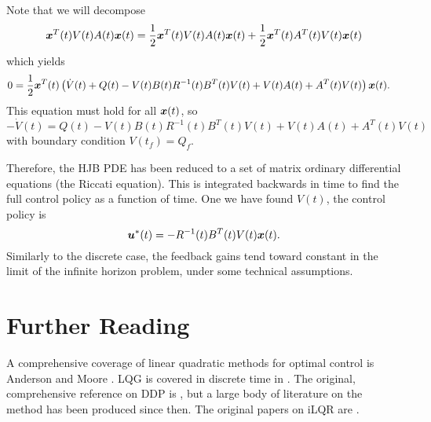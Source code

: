 Note that we will decompose
\begin{equation}
    \bm{x}^T(t) V(t) A(t) \bm{x}(t) = \frac{1}{2} \bm{x}^T(t) V(t) A(t) \bm{x}(t) + \frac{1}{2} \bm{x}^T(t) A^T(t) V(t) \bm{x}(t)
\end{equation}
which yields
\begin{align}
    0 &= \frac{1}{2} \bm{x}^T(t) \left(\dot{V}(t) + Q(t) - V(t) B(t) R^{-1}(t) B^T(t) V(t) + V(t) A(t) + A^T(t) V(t)\right) \bm{x}(t).
\end{align}
This equation must hold for all $\bm{x}(t)$, so 
\begin{equation}
    -\dot{V}(t) = Q(t) - V(t) B(t) R^{-1}(t) B^T(t) V(t) + V(t) A(t) + A^T(t) V(t)
\end{equation}
with boundary condition $V(t_f) = Q_f$.

Therefore, the HJB PDE has been reduced to a set of matrix ordinary differential equations (the Riccati equation). This is integrated backwards in time to find the full control policy as a function of time. One we have found $V(t)$, the control policy is
\begin{equation}
    \bm{u}^*(t) = - R^{-1}(t) B^T(t) V(t) \bm{x}(t).
\end{equation}
Similarly to the discrete case, the feedback gains tend toward constant in the limit of the infinite horizon problem, under some technical assumptions.

\section{Further Reading}

A comprehensive coverage of linear quadratic methods for optimal control is Anderson and Moore \cite{anderson2007optimal}. LQG is covered in discrete time in \cite{bertsekas1995dynamic}. The original, comprehensive reference on DDP is \cite{mayne1970ddp}, but a large body of literature on the method has been produced since then. The original papers on iLQR are \cite{todorov2005generalized,li2004iterative}.

